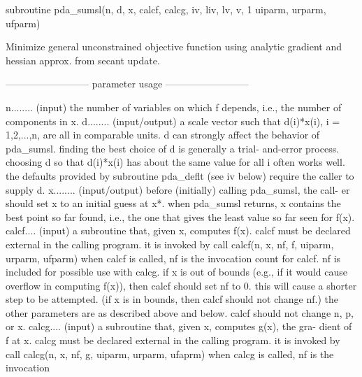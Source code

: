 \documentclass[11pt,twoside,nolof]{starlink}
\begin{document}
\begin{terminalv}
      subroutine pda_sumsl(n, d, x, calcf, calcg, iv, liv, lv, v,
     1                  uiparm, urparm, ufparm)


 Minimize general unconstrained objective function using analytic
 gradient and hessian approx. from secant update.

 --------------------------  parameter usage  --------------------------

  n........ (input) the number of variables on which  f  depends, i.e.,
                   the number of components in  x.
  d........ (input/output) a scale vector such that  d(i)*x(i),
                   i = 1,2,...,n,  are all in comparable units.
                   d can strongly affect the behavior of pda_sumsl.
                   finding the best choice of d is generally a trial-
                   and-error process.  choosing d so that d(i)*x(i)
                   has about the same value for all i often works well.
                   the defaults provided by subroutine pda_deflt (see iv
                   below) require the caller to supply d.
  x........ (input/output) before (initially) calling pda_sumsl, the call-
                   er should set  x  to an initial guess at  x*.  when
                   pda_sumsl returns,  x  contains the best point so far
                   found, i.e., the one that gives the least value so
                   far seen for  f(x).
  calcf.... (input) a subroutine that, given x, computes f(x).  calcf
                   must be declared external in the calling program.
                   it is invoked by
                        call calcf(n, x, nf, f, uiparm, urparm, ufparm)
                   when calcf is called, nf is the invocation
                   count for calcf.  nf is included for possible use
                   with calcg.  if x is out of bounds (e.g., if it
                   would cause overflow in computing f(x)), then calcf
                   should set nf to 0.  this will cause a shorter step
                   to be attempted.  (if x is in bounds, then calcf
                   should not change nf.)  the other parameters are as
                   described above and below.  calcf should not change
                   n, p, or x.
  calcg.... (input) a subroutine that, given x, computes g(x), the gra-
                   dient of f at x.  calcg must be declared external in
                   the calling program.  it is invoked by
                        call calcg(n, x, nf, g, uiparm, urparm, ufaprm)
                   when calcg is called, nf is the invocation

\end{terminalv}
\end{document}
